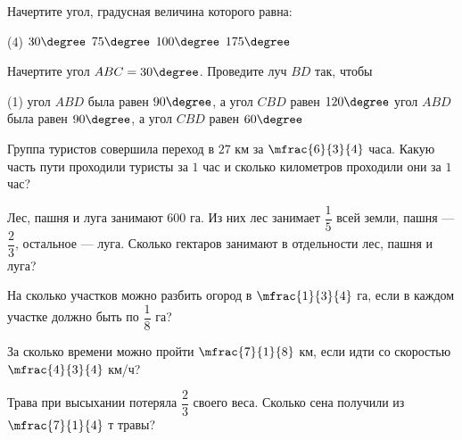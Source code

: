 %
%
%

%
%
\begin{class}[number=7]
	\begin{listofex}
	\item Начертите угол, градусная величина которого равна:
	\begin{tasks}(4)
		\task \( 30\degree \)
		\task \( 75\degree \)
		\task \( 100\degree \)
		\task \( 175\degree \)
	\end{tasks}	
	\item Начертите угол \( ABC=30\degree \). Проведите луч \( BD \) так, чтобы 
	\begin{tasks}(1)
		\task  угол \( ABD \) была равен \( 90\degree \), а угол \( CBD \) равен \( 120\degree \)
		\task  угол \( ABD \) была равен \( 90\degree \), а угол \( CBD \) равен \( 60\degree \)
	\end{tasks}	
	 \item Группа туристов совершила переход в \( 27 \) км за \( \mfrac{6}{3}{4} \) часа. Какую часть пути проходили туристы за \( 1 \) час и сколько километров проходили они за \( 1 \) час?
	 \item Лес, пашня и луга занимают \( 600 \) га. Из них лес занимает \( \dfrac{1}{5} \) всей земли, пашня --- \( \dfrac{2}{3} \), остальное --- луга. Сколько гектаров занимают в отдельности лес, пашня и луга?
	 \item На сколько участков можно разбить огород в \( \mfrac{1}{3}{4} \) га, если в каждом участке должно быть по \( \dfrac{1}{8} \) га?
	 \item За сколько времени можно пройти \( \mfrac{7}{1}{8} \) км, если идти со скоростью \( \mfrac{4}{3}{4} \) км/ч?
	 \item Трава при высыхании потеряла \( \dfrac{2}{3} \) своего веса. Сколько сена получили из \( \mfrac{7}{1}{4} \) т травы?
	\end{listofex}
\end{class}
